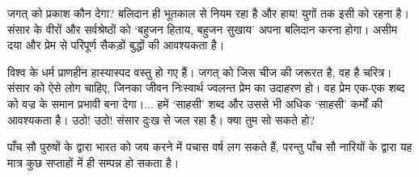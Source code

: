 जगत् को प्रकाश कौन देगा? बलिदान ही भूतकाल से नियम रहा है और हाय! युगों तक इसी को रहना है। संसार के वीरों और सर्वश्रेष्ठों को ‘बहुजन हिताय, बहुजन सुखाय’ अपना बलिदान करना होगा। असीम दया और प्रेम से परिपूर्ण सैकड़ों बुद्धों की आवश्यकता है। 

विश्व के धर्म प्राणहीन हास्यास्पद वस्तु हो गए हैं। जगत् को जिस चीज की जरूरत है, वह है चरित्र। संसार को ऐसे लोग चाहिए, जिनका जीवन निःस्वार्थ ज्वलन्त प्रेम का उदाहरण हो। वह प्रेम एक-एक शब्द को वज्र के समान प्रभावी बना देगा।... हमें ‘साहसी’ शब्द और उससे भी अधिक ‘साहसी’ कर्मों की आवश्यकता है। उठो! उठो! संसार दुःख से जल रहा है। क्या तुम सो सकते हो? 

पाँच सौ पुरुषों के द्वारा भारत को जय करने में पचास वर्ष लग सकते हैं, परन्तु पाँच सौ नारियों के द्वारा यह मात्र कुछ सप्ताहों में ही सम्पन्न हो सकता है। 

\delimiter

\addtoendnotes{\protect\end{multicols}}


